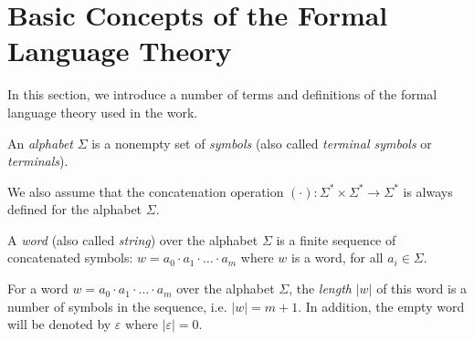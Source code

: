\section{Basic Concepts of the Formal Language Theory}\label{sec:ch1/sec3}
In this section, we introduce a number of terms and definitions of the formal language theory used in the work.

\begin{definition}[An alphabet]
	An \textit{alphabet} $\Sigma$ is a nonempty set of \textit{symbols} (also called \textit{terminal symbols} or \textit{terminals}).
\end{definition}


We also assume that the concatenation operation $(\cdot) : \Sigma^* \times \Sigma^* \to \Sigma^*$ is always defined for the alphabet $\Sigma$.

\begin{definition}[A word]
	A \textit{word} (also called \textit{string}) over the alphabet $\Sigma$ is a finite sequence of concatenated symbols: $w = a_0 \cdot a_1 \cdot \ldots \cdot a_m$ where $w$ is a word, for all $a_i \in \Sigma$.
\end{definition}

\begin{definition}
	For a word $w = a_0 \cdot a_1 \cdot \ldots \cdot a_m$ over the alphabet $\Sigma$, the \textit{length} $|w|$ of this word is a number of symbols in the sequence, i.e. $|w| = m + 1$. In addition, the empty word will be denoted by $\varepsilon$ where $|\varepsilon| = 0$.
\end{definition}

